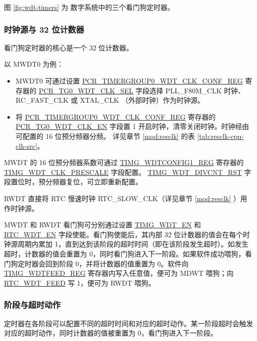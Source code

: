\documentclass[main\_\_CN.tex]{subfiles}
\begin{document}
图 \ref{fig:wdt-timers} 为 \chipname{} 数字系统中的三个看门狗定时器。

\subsubsection{时钟源与 32 位计数器}
看门狗定时器的核心是一个 32 位计数器。

以 MWDT0 为例：

\begin{itemize}
    \item MWDT0 可通过设置 \hyperref[regdesc:PCRTIMERGROUP0WDTCLKCONFREG]{PCR\_TIMERGROUP0\_WDT\_CLK\_CONF\_REG} 寄存器的 \hyperref[fielddesc:PCRTG0WDTCLKSEL]{PCR\_TG0\_WDT\_CLK\_SEL} 字段选择 PLL\_F80M\_CLK 时钟、RC\_FAST\_CLK 或 XTAL\_CLK （外部时钟）作为时钟源。

    \item 将 \hyperref[regdesc:PCRTIMERGROUP0WDTCLKCONFREG]{PCR\_TIMERGROUP0\_WDT\_CLK\_CONF\_REG} 寄存器的 \hyperref[fielddesc:PCRTG0WDTCLKEN]{PCR\_TG0\_WDT\_CLK\_EN} 字段置 1 开启时钟，清零关闭时钟。时钟经由可配置的 16 位预分频器分频。 详见章节 \ref{mod:resclk} \textit{} 的表 \ref{tab:resclk-cpu-clk-src}。
\end{itemize}

MWDT 的 16 位预分频器系数可通过 \hyperref[regdesc:TIMGWDTCONFIG1REG]{TIMG\_WDTCONFIG1\_REG} 寄存器的 \hyperref[fielddesc:TIMGWDTCLKPRESCALE]{TIMG\_WDT\_CLK\_PRESCALE} 字段配置。 \hyperref[fielddesc:TIMGWDTDIVCNTRST]{TIMG\_WDT\_DIVCNT\_RST} 字段置位时，预分频器复位，可立即重新配置。

RWDT 直接将 RTC 慢速时钟 RTC\_SLOW\_CLK（详见章节 \ref{mod:resclk} \textit{}）用作时钟源。



MWDT 和 RWDT 看门狗可分别通过设置 \hyperref[fielddesc:TIMGWDTEN]{TIMG\_WDT\_EN} 和 \hyperref[fielddesc:RTCWDTEN]{RTC\_WDT\_EN} 字段使能。看门狗使能后，其内部 32 位计数器的值会在每个时钟源周期内累加 1，直到达到该阶段的超时时间（即在该阶段发生超时）。如发生超时，计数器的值会重置为 0，同时看门狗进入下一阶段。如果软件成功喂狗，看门狗定时器会回到阶段 0，并将计数器的值重置为 0。软件向 \hyperref[regdesc:TIMGWDTFEEDREG]{TIMG\_WDTFEED\_REG} 寄存器内写入任意值，便可为 MDWT  喂狗；向 \hyperref[fielddesc:RTCWDTFEED]{RTC\_WDT\_FEED} 写 1，便可为 RWDT 喂狗。


\subsubsection{阶段与超时动作}\label{sec:wdt-timeout}
定时器在各阶段可以配置不同的超时时间和对应的超时动作。某一阶段超时会触发对应的超时动作，同时计数器的值被重置为 0，看门狗进入下一阶段。
\end{document}
